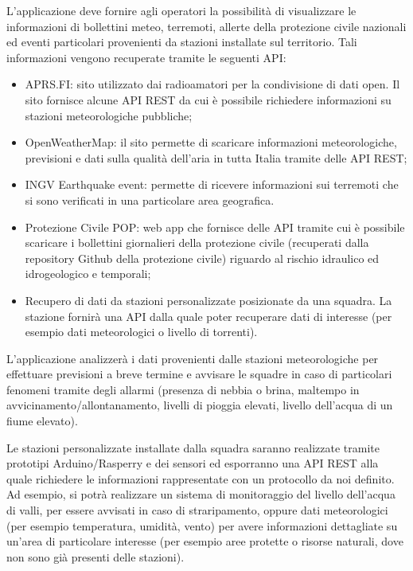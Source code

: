 L'applicazione deve fornire agli operatori la possibilità di visualizzare le informazioni di bollettini meteo, terremoti, allerte della protezione civile nazionali ed eventi particolari provenienti da stazioni installate sul territorio. Tali informazioni vengono recuperate tramite le seguenti API: 
\begin{itemize}
	\item APRS.FI: sito utilizzato dai radioamatori per la condivisione di dati open. Il sito fornisce alcune API REST da cui è possibile richiedere informazioni su stazioni meteorologiche pubbliche;
	\item OpenWeatherMap: il sito permette di scaricare informazioni meteorologiche, previsioni e dati sulla qualità dell’aria in tutta Italia tramite delle API REST;
	\item INGV Earthquake event: permette di ricevere informazioni sui terremoti che si sono verificati in una particolare area geografica.
	\item Protezione Civile POP: web app che fornisce delle API tramite cui è possibile scaricare i bollettini giornalieri della protezione civile (recuperati dalla repository Github della protezione civile) riguardo al rischio idraulico ed idrogeologico e temporali;
	\item Recupero di dati da stazioni personalizzate posizionate da una squadra. La stazione fornirà una API dalla quale poter recuperare dati di interesse (per esempio dati meteorologici o livello di torrenti). 
\end{itemize}

L'applicazione analizzerà i dati provenienti dalle stazioni meteorologiche per effettuare previsioni a breve termine e avvisare le squadre in caso di particolari fenomeni tramite degli allarmi (presenza di nebbia o brina, maltempo in avvicinamento/allontanamento, livelli di pioggia elevati, livello dell'acqua di un fiume elevato).

Le stazioni personalizzate installate dalla squadra saranno realizzate tramite prototipi Arduino/Rasperry e dei sensori ed esporranno una API REST alla quale richiedere le informazioni rappresentate con un protocollo da noi definito. Ad esempio, si potrà realizzare un sistema di monitoraggio del livello dell’acqua di valli, per essere avvisati in caso di straripamento, oppure dati meteorologici (per esempio temperatura, umidità, vento) per avere informazioni dettagliate su un’area di particolare interesse (per esempio aree protette o risorse naturali, dove non sono già presenti delle stazioni). 

